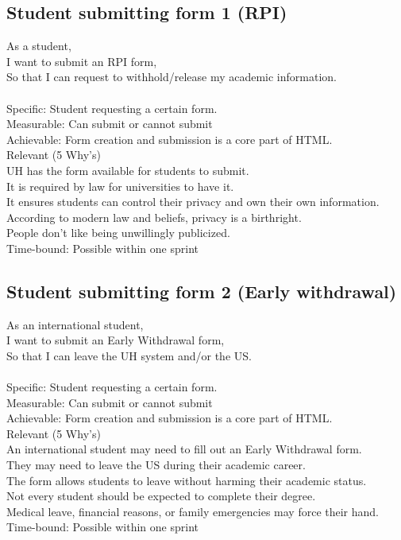 \documentclass[10pt]{book}
\begin{document}
\begin{landscape}
\section*{Student submitting form 1 (RPI)}
As a student,\\
I want to submit an RPI form,\\
So that I can request to withhold/release my academic information.\\
\\
Specific: Student requesting a certain form.\\
Measurable: Can submit or cannot submit\\
Achievable: Form creation and submission is a core part of HTML.\\
Relevant (5 Why's)\\
    \indent
    UH has the form available for students to submit.\\
    \indent
    It is required by law for universities to have it.\\
    \indent
    It ensures students can control their privacy and own their own information.\\
    \indent
    According to modern law and beliefs, privacy is a birthright.\\
    \indent
    People don't like being unwillingly publicized.\\
Time-bound: Possible within one sprint
\end{landscape}

\begin{landscape}
\section*{Student submitting form 2 (Early withdrawal)}
As an international student,\\
I want to submit an Early Withdrawal form,\\
So that I can leave the UH system and/or the US.\\
\\
Specific: Student requesting a certain form.\\
Measurable: Can submit or cannot submit\\
Achievable: Form creation and submission is a core part of HTML.\\
Relevant (5 Why's)\\
    \indent
    An international student may need to fill out an Early Withdrawal form.\\
    \indent
    They may need to leave the US during their academic career.\\
    \indent
    The form allows students to leave without harming their academic status.\\
    \indent
    Not every student should be expected to complete their degree.\\
    \indent
    Medical leave, financial reasons, or family emergencies may force their hand.\\
Time-bound: Possible within one sprint
\end{landscape}
\end{document}
